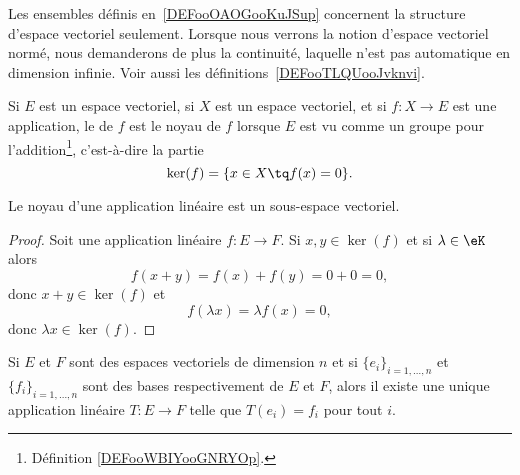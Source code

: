 \begin{remark}
    Les ensembles définis en~\ref{DEFooOAOGooKuJSup} concernent la structure d'espace vectoriel seulement. Lorsque nous verrons la notion d'espace vectoriel normé, nous demanderons de plus la continuité, laquelle n'est pas automatique en dimension infinie. Voir aussi les définitions~\ref{DEFooTLQUooJvknvi}.
\end{remark}

\begin{definition}
    Si \( E\) est un espace vectoriel, si \( X\) est un espace vectoriel, et si \( f\colon X\to E\) est une application, le  de \( f\) est le noyau de \( f\) lorsque \( E\) est vu comme un groupe pour l'addition\footnote{Définition \ref{DEFooWBIYooGNRYOp}.}, c'est-à-dire la partie
    \begin{equation}
        \ker(f)=\{ x\in X\tq f(x)=0 \}.
    \end{equation}
\end{definition}

\begin{proposition}     \label{PROPooRLLPooKYzsJp}
    Le noyau d'une application linéaire est un sous-espace vectoriel.
\end{proposition}

\begin{proof}
    Soit une application linéaire \( f\colon E\to F\). Si \( x,y\in \ker(f)\) et si \( \lambda\in \eK\) alors
    \begin{equation}
        f(x+y)=f(x)+f(y)=0+0=0,
    \end{equation}
    donc \( x+y\in \ker(f)\) et
    \begin{equation}
        f(\lambda x)=\lambda f(x)=0,
    \end{equation}
    donc \( \lambda x\in \ker(f)\).
\end{proof}

\begin{proposition}
    Si \( E\) et \( F\) sont des espaces vectoriels de dimension \( n\) et si \( \{ e_i \}_{i=1,\ldots, n}\) et \( \{ f_i \}_{i=1,\ldots, n}\) sont des bases respectivement de \( E\) et \( F\), alors il existe une unique application linéaire \( T\colon E\to F\) telle que \( T(e_i)=f_i\) pour tout \( i\).
\end{proposition}

